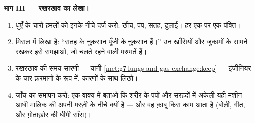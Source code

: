 \begin{problem}[{सप्ताहांत समस्या --- इंसानी धौंकनी की एक इंजीनियर वाली
जाँच}]
\medskip\noindent\textbf{भाग III --- रखरखाव का लेखा।}
\begin{enumerate}[resume]
  \item धुएँ के चारों हमलों को इनके नीचे दर्ज करो: खींच, पंप, सतह,
        ढुलाई। हर एक पर एक पंक्ति।
  \item मिसल में लिखा है: ``सतह के नुक़सान पूँजी के नुक़सान हैं।''
        उन खाँसियों और ज़ुकामों के सामने रखकर इसे समझाओ, जो चलते
        रहने वाली मरम्मतें हैं।
  \item रखरखाव की समय-सारणी --- यानी
        \cref{met:g7:lungs-and-gas-exchange:keep} --- इंजीनियर के
        चार फ़रमानों के रूप में, कारणों के साथ लिखो।
  \item जाँच का समापन करो: एक वाक्य में बताओ कि शरीर के पंपों और
        सरहदों में अकेली यही मशीन आधी मालिक की अपनी मरज़ी के नीचे
        क्यों है --- और वह क़ाबू किस काम आता है (बोली, गीत, और
        ग़ोताख़ोर की धीमी साँस)।
\end{enumerate}
\end{problem}
